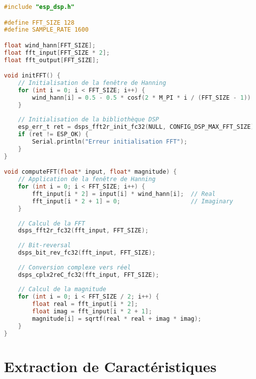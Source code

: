 \begin{lstlisting}[language=C, caption=Calcul FFT optimisé pour ESP32]
#include "esp_dsp.h"

#define FFT_SIZE 128
#define SAMPLE_RATE 1600

float wind_hann[FFT_SIZE];
float fft_input[FFT_SIZE * 2];
float fft_output[FFT_SIZE];

void initFFT() {
    // Initialisation de la fenêtre de Hanning
    for (int i = 0; i < FFT_SIZE; i++) {
        wind_hann[i] = 0.5 - 0.5 * cosf(2 * M_PI * i / (FFT_SIZE - 1));
    }
    
    // Initialisation de la bibliothèque DSP
    esp_err_t ret = dsps_fft2r_init_fc32(NULL, CONFIG_DSP_MAX_FFT_SIZE);
    if (ret != ESP_OK) {
        Serial.println("Erreur initialisation FFT");
    }
}

void computeFFT(float* input, float* magnitude) {
    // Application de la fenêtre de Hanning
    for (int i = 0; i < FFT_SIZE; i++) {
        fft_input[i * 2] = input[i] * wind_hann[i];  // Real
        fft_input[i * 2 + 1] = 0;                    // Imaginary
    }
    
    // Calcul de la FFT
    dsps_fft2r_fc32(fft_input, FFT_SIZE);
    
    // Bit-reversal
    dsps_bit_rev_fc32(fft_input, FFT_SIZE);
    
    // Conversion complexe vers réel
    dsps_cplx2reC_fc32(fft_input, FFT_SIZE);
    
    // Calcul de la magnitude
    for (int i = 0; i < FFT_SIZE / 2; i++) {
        float real = fft_input[i * 2];
        float imag = fft_input[i * 2 + 1];
        magnitude[i] = sqrtf(real * real + imag * imag);
    }
}
\end{lstlisting}

\section{Extraction de Caractéristiques}

